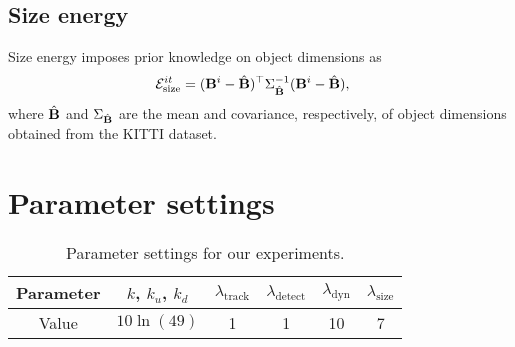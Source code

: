 \documentclass[10pt,twocolumn,letterpaper]{article}
\begin{document}
\subsection{Size energy}
Size energy imposes prior knowledge on object dimensions as
\begin{align}
  \label{eq:totalSizeEnergy}
  \mathcal{E}^{it}_{\text{size}} &= (\mathbf{B}^{i} - \hat{\mathbf{B}})^\top\Sigma_{\hat{\mathbf{B}}}^{-1}(\mathbf{B}^{i} -
  \hat{\mathbf{B}}),
\end{align}
where $\hat{\mathbf{B}}$ and $\Sigma_{\hat{\mathbf{B}}}$ are the mean and covariance, respectively, of object dimensions obtained from the KITTI dataset.

\section{Parameter settings}
\begin{table}[!h]
  \centering
\begin{tabular}{cccccc}
  \toprule
  Parameter
  & $k$, $k_u$, $k_d$ 
  & $\lambda_{\text{track}}$  
  & $\lambda_{\text{detect}}$ 
  & $\lambda_{\text{dyn}}$    
  & $\lambda_{\text{size}}$\\   
  
  \midrule
  Value
  & $10\ln({49})$
  & 1
  & 1
  & 10
  & 7\\
  \bottomrule
\end{tabular}
\caption{Parameter settings for our experiments.}
\label{tab:paramters}
\end{table}
\end{document}
